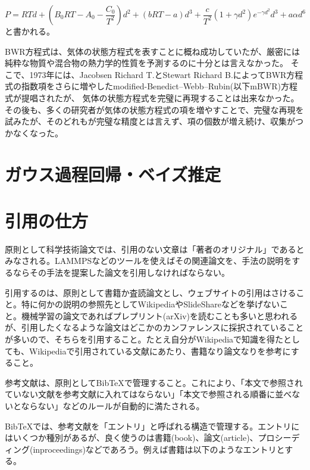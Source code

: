 \documentclass[titlepage]{jsreport}
\begin{document}
\large
\begin{equation}
P=RTd+\left(B_0RT-A_0-{\frac{C_0}{T^2}}\right)d^2+(bRT-a)d^3+{\frac{c}{T^2}}(1+{\gamma}d^2)e^{-{\gamma}d^2}d^3+a{\alpha}d^6\label{eq:BWR}
\end{equation}
\normalsize
と書かれる。

BWR方程式は、気体の状態方程式を表すことに概ね成功していたが、厳密には純粋な物質や混合物の熱力学的性質を予測するのに十分とは言えなかった。
そこで、1973年には、Jacobsen Richard T.とStewart Richard B.によってBWR方程式の指数項をさらに増やしたmodified-Benedict–Webb–Rubin(以下mBWR)方程式が提唱\cite{m-BWR-equation}されたが、
気体の状態方程式を完璧に再現することは出来なかった。
その後も、多くの研究者が気体の状態方程式の項を増やすことで、完璧な再現を試みた\cite{MCCARTY1974276}\cite{BWR-equation:13}\cite{BWR-equation:25}が、そのどれもが完璧な精度とは言えず、項の個数が増え続け、収集がつかなくなった。


\section{ガウス過程回帰・ベイズ推定}


\section{引用の仕方}

原則として科学技術論文では、引用のない文章は「著者のオリジナル」であるとみなされる。LAMMPSなどのツールを使えばその関連論文を、手法の説明をするならその手法を提案した論文を引用しなければならない。

引用するのは、原則として書籍か査読論文とし、ウェブサイトの引用はさけること。特に何かの説明の参照先としてWikipediaやSlideShareなどを挙げないこと。機械学習の論文であればプレプリント(arXiv)を読むことも多いと思われるが、引用したくなるような論文はどこかのカンファレンスに採択されていることが多いので、そちらを引用すること。たとえ自分がWikipediaで知識を得たとしても、Wikipediaで引用されている文献にあたり、書籍なり論文なりを参考にすること。

参考文献は、原則としてBibTeXで管理すること。これにより、「本文で参照されていない文献を参考文献に入れてはならない」「本文で参照される順番に並べないとならない」などのルールが自動的に満たされる。

BibTeXでは、参考文献を「エントリ」と呼ばれる構造で管理する。エントリにはいくつか種別があるが、良く使うのは書籍(book)、論文(article)、プロシーディング(inproceedings)などであろう。例えば書籍は以下のようなエントリとする。
\end{document}
